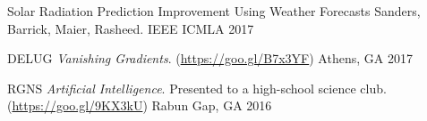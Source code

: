 
\begin{cvhonors}

\cvhonor
{Solar Radiation Prediction Improvement Using Weather Forecasts}
{Sanders, Barrick, Maier, Rasheed.}
{IEEE ICMLA}
{2017}

\end{cvhonors}


\begin{cvhonors}

\cvhonor
{DELUG}
{\textit{Vanishing Gradients}. (\url{https://goo.gl/B7x3YF})}
{Athens, GA}
{2017}

\cvhonor
{RGNS}
{\textit{Artificial Intelligence}. Presented to a high-school science club. (\url{https://goo.gl/9KX3kU})}
{Rabun Gap, GA}
{2016}

\end{cvhonors}
